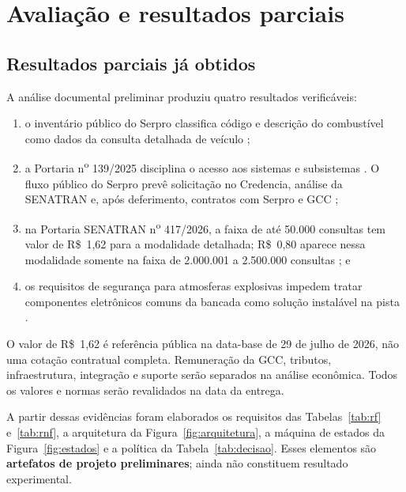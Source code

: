 \section{Avaliação e resultados parciais}
\label{sec:resultados}

\subsection{Resultados parciais já obtidos}

A análise documental preliminar produziu quatro resultados verificáveis:

\begin{sloppypar}
\begin{enumerate}
  \item o inventário público do Serpro classifica código e descrição do
  combustível como dados da consulta detalhada de veículo
  \cite{serproDadosVeiculo2026};
  \item a Portaria n\textsuperscript{o} 139/2025 disciplina o acesso aos sistemas e subsistemas
  \cite{senatran1392025}. O fluxo público do Serpro prevê solicitação no
  Credencia, análise da SENATRAN e, após deferimento, contratos com Serpro e GCC
  \cite{serproComoContratar2026};
  \item na Portaria SENATRAN n\textsuperscript{o} 417/2026, a faixa de até 50.000 consultas tem
  valor de R\$~1{,}62 para a modalidade detalhada; R\$~0{,}80 aparece nessa
  modalidade somente na faixa de 2.000.001 a 2.500.000 consultas
  \cite{senatran4172026}; e
  \item os requisitos de segurança para atmosferas explosivas impedem tratar
  componentes eletrônicos comuns da bancada como solução instalável na pista
  \cite{inmetro1152022,nr20}.
\end{enumerate}
\end{sloppypar}

O valor de R\$~1{,}62 é referência pública na data-base de 29 de julho de 2026,
não uma cotação contratual completa. Remuneração da GCC, tributos, infraestrutura,
integração e suporte serão separados na análise econômica. Todos os valores e
normas serão revalidados na data da entrega.

A partir dessas evidências foram elaborados os requisitos das
Tabelas~\ref{tab:rf} e~\ref{tab:rnf}, a arquitetura da
Figura~\ref{fig:arquitetura}, a máquina de estados da Figura~\ref{fig:estados} e
a política da Tabela~\ref{tab:decisao}. Esses elementos são \textbf{artefatos de
projeto preliminares}; ainda não constituem resultado experimental.

